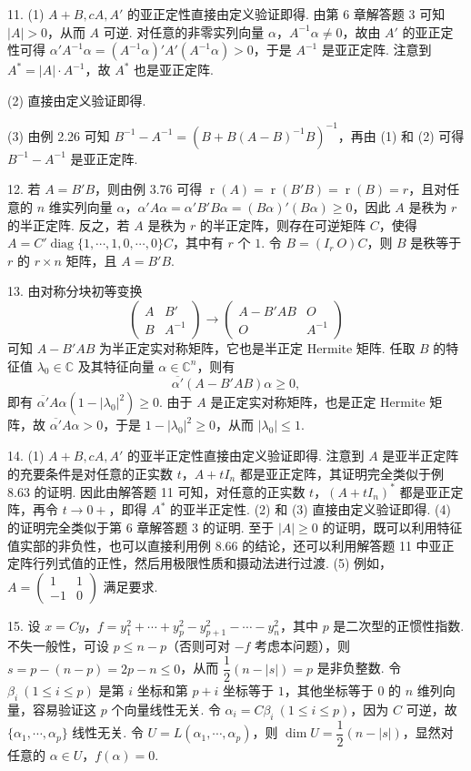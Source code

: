 \documentclass[UTF8, 12pt, fontset=fandol, oneside]{ctexart}
\begin{document}
11. (1) $A+B,cA,A'$ 的亚正定性直接由定义验证即得. 由第 6 章解答题 3 可知 $|A|>0$，从而 $A$ 可逆. 对任意的非零实列向量 $\alpha$，$A^{-1}\alpha\ne 0$，故由 $A'$ 的亚正定性可得 $\alpha'A^{-1}\alpha=(A^{-1}\alpha)'A'(A^{-1}\alpha)>0$，于是 $A^{-1}$ 是亚正定阵. 注意到 $A^*=|A|\cdot A^{-1}$，故 $A^*$ 也是亚正定阵.

(2) 直接由定义验证即得.

(3) 由例 2.26 可知 $B^{-1}-A^{-1}=(B+B(A-B)^{-1}B)^{-1}$，再由 (1) 和 (2) 可得 $B^{-1}-A^{-1}$ 是亚正定阵.

12. 若 $A=B'B$，则由例 3.76 可得 $\operatorname{r}(A)=\operatorname{r}(B'B)=\operatorname{r}(B)=r$，且对任意的 $n$ 维实列向量 $\alpha$，$\alpha'A\alpha=\alpha'B'B\alpha=(B\alpha)'(B\alpha)\ge 0$，因此 $A$ 是秩为 $r$ 的半正定阵. 反之，若 $A$ 是秩为 $r$ 的半正定阵，则存在可逆矩阵 $C$，使得 $A=C'\operatorname{diag}\{1,\cdots,1,0,\cdots,0\}C$，其中有 $r$ 个 $1$. 令 $B=(I_r\ O)C$，则 $B$ 是秩等于 $r$ 的 $r\times n$ 矩阵，且 $A=B'B$.

13. 由对称分块初等变换
\[
\left(\begin{array}{cc}
A & B'\\
B & A^{-1}
\end{array}\right)
\to
\left(\begin{array}{cc}
A-B'AB & O\\
O & A^{-1}
\end{array}\right)
\]
可知 $A-B'AB$ 为半正定实对称矩阵，它也是半正定 Hermite 矩阵. 任取 $B$ 的特征值 $\lambda_0\in\mathbb{C}$ 及其特征向量 $\alpha\in\mathbb{C}^n$，则有
\[
\overline{\alpha'}(A-B'AB)\alpha\ge 0,
\]
即有 $\overline{\alpha'}A\alpha(1-|\lambda_0|^2)\ge 0$. 由于 $A$ 是正定实对称矩阵，也是正定 Hermite 矩阵，故 $\overline{\alpha'}A\alpha>0$，于是 $1-|\lambda_0|^2\ge 0$，从而 $|\lambda_0|\le 1$.

14. (1) $A+B,cA,A'$ 的亚半正定性直接由定义验证即得. 注意到 $A$ 是亚半正定阵的充要条件是对任意的正实数 $t$，$A+tI_n$ 都是亚正定阵，其证明完全类似于例 8.63 的证明. 因此由解答题 11 可知，对任意的正实数 $t$，$(A+tI_n)^*$ 都是亚正定阵，再令 $t\to 0+$，即得 $A^*$ 的亚半正定性. (2) 和 (3) 直接由定义验证即得. (4) 的证明完全类似于第 6 章解答题 3 的证明. 至于 $|A|\ge 0$ 的证明，既可以利用特征值实部的非负性，也可以直接利用例 8.66 的结论，还可以利用解答题 11 中亚正定阵行列式值的正性，然后用极限性质和摄动法进行过渡. (5) 例如，$A=\left(\begin{array}{cc}1&1\\ -1&0\end{array}\right)$ 满足要求.

15. 设 $x=Cy$，$f=y_1^2+\cdots+y_p^2-y_{p+1}^2-\cdots-y_n^2$，其中 $p$ 是二次型的正惯性指数. 不失一般性，可设 $p\le n-p$（否则可对 $-f$ 考虑本问题），则 $s=p-(n-p)=2p-n\le 0$，从而 $\dfrac12(n-|s|)=p$ 是非负整数. 令 $\beta_i\ (1\le i\le p)$ 是第 $i$ 坐标和第 $p+i$ 坐标等于 $1$，其他坐标等于 $0$ 的 $n$ 维列向量，容易验证这 $p$ 个向量线性无关. 令 $\alpha_i=C\beta_i\ (1\le i\le p)$，因为 $C$ 可逆，故 $\{\alpha_1,\cdots,\alpha_p\}$ 线性无关. 令 $U=L(\alpha_1,\cdots,\alpha_p)$，则 $\dim U=\dfrac12(n-|s|)$，显然对任意的 $\alpha\in U$，$f(\alpha)=0$.
\end{document}
